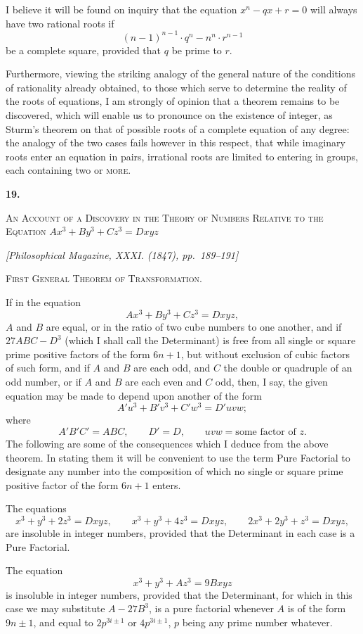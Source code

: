 \documentclass[11pt]{article}
\newcommand{\paperhead}[3]{%
  \clearpage
  \begin{center}
  {\Large\bfseries #1.}\par\vspace{0.85em}
  {\large\scshape #2}\par\vspace{0.6em}
  {\itshape [#3]}\par
  \end{center}\vspace{0.4em}}
\newcommand{\sourcepage}[1]{\marginpar{\scriptsize p.~#1}}
\begin{document}
{{I believe it will be found on inquiry that the equation $x^n-qx+r=0$ will always have two rational roots if
\[
(n-1)^{n-1}\cdot q^n-n^n\cdot r^{n-1}
\]
be a complete square, provided that $q$ be prime to $r$.

Furthermore, viewing the striking analogy of the general nature of the conditions of rationality already obtained, to those which serve to determine the reality of the roots of equations, I am strongly of opinion that a theorem remains to be discovered, which will enable us to pronounce on the existence of integer, as Sturm's theorem on that of possible roots of a complete equation of any degree: the analogy of the two cases fails however in this respect, that while imaginary roots enter an equation in pairs, irrational roots are limited to entering in groups, each containing two or \textsc{more}.

\paperhead{19}{An Account of a Discovery in the Theory of Numbers Relative to the Equation $Ax^3+By^3+Cz^3=Dxyz$}{Philosophical Magazine, XXXI. (1847), pp.~189--191}

\begin{center}
{\scshape First General Theorem of Transformation.}
\end{center}

\sourcepage{107}
If in the equation
\[
Ax^3+By^3+Cz^3=Dxyz, \tag{1}
\]
$A$ and $B$ are equal, or in the ratio of two cube numbers to one another, and if $27ABC-D^3$ (which I shall call the Determinant) is free from all single or square prime positive factors of the form $6n+1$, but without exclusion of cubic factors of such form, and if $A$ and $B$ are each odd, and $C$ the double or quadruple of an odd number, or if $A$ and $B$ are each even and $C$ odd, then, I say, the given equation may be made to depend upon another of the form
\[
A'u^3+B'v^3+C'w^3=D'uvw;
\]
where
\[
A'B'C'=ABC,\qquad D'=D,\qquad uvw=\text{some factor of }z.
\]
The following are some of the consequences which I deduce from the above theorem. In stating them it will be convenient to use the term Pure Factorial to designate any number into the composition of which no single or square prime positive factor of the form $6n+1$ enters.

The equations
\[
x^3+y^3+2z^3=Dxyz,
\qquad
x^3+y^3+4z^3=Dxyz,
\qquad
2x^3+2y^3+z^3=Dxyz,
\]
are insoluble in integer numbers, provided that the Determinant in each case is a Pure Factorial.

\sourcepage{108}
The equation
\[
x^3+y^3+Az^3=9Bxyz
\]
is insoluble in integer numbers, provided that the Determinant, for which in this case we may substitute $A-27B^3$, is a pure factorial whenever $A$ is of the form $9n\pm1$, and equal to $2p^{3i\pm1}$ or $4p^{3i\pm1}$, $p$ being any prime number whatever.

}}
\end{document}
